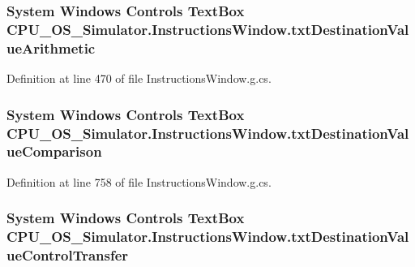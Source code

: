 \subsubsection[{txt\+Destination\+Value\+Arithmetic}]{\setlength{\rightskip}{0pt plus 5cm}System Windows Controls Text\+Box C\+P\+U\+\_\+\+O\+S\+\_\+\+Simulator.\+Instructions\+Window.\+txt\+Destination\+Value\+Arithmetic\hspace{0.3cm}{\ttfamily [package]}}\label{class_c_p_u___o_s___simulator_1_1_instructions_window_adac073cb591b15be22d041695ff498e4}


Definition at line 470 of file Instructions\+Window.\+g.\+cs.

\hypertarget{class_c_p_u___o_s___simulator_1_1_instructions_window_ab44686bd174144a0c1042579d6665547}{}
\subsubsection[{txt\+Destination\+Value\+Comparison}]{\setlength{\rightskip}{0pt plus 5cm}System Windows Controls Text\+Box C\+P\+U\+\_\+\+O\+S\+\_\+\+Simulator.\+Instructions\+Window.\+txt\+Destination\+Value\+Comparison\hspace{0.3cm}{\ttfamily [package]}}\label{class_c_p_u___o_s___simulator_1_1_instructions_window_ab44686bd174144a0c1042579d6665547}


Definition at line 758 of file Instructions\+Window.\+g.\+cs.

\hypertarget{class_c_p_u___o_s___simulator_1_1_instructions_window_a0049dce789d892e6620158859bcf7057}{}
\subsubsection[{txt\+Destination\+Value\+Control\+Transfer}]{\setlength{\rightskip}{0pt plus 5cm}System Windows Controls Text\+Box C\+P\+U\+\_\+\+O\+S\+\_\+\+Simulator.\+Instructions\+Window.\+txt\+Destination\+Value\+Control\+Transfer\hspace{0.3cm}{\ttfamily [package]}}\label{class_c_p_u___o_s___simulator_1_1_instructions_window_a0049dce789d892e6620158859bcf7057}


